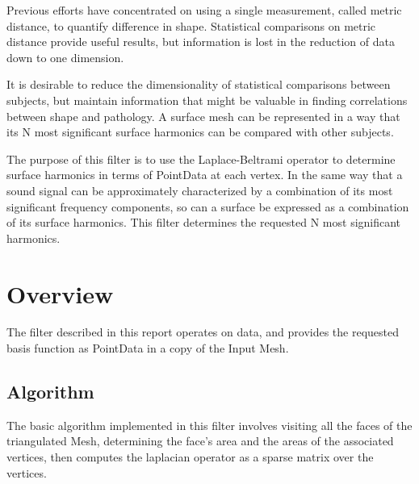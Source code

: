 \documentclass{InsightArticle}
\begin{document}
Previous efforts have concentrated on using a single measurement, called metric
distance, to quantify difference in shape.  Statistical comparisons on metric
distance provide useful results, but information is lost in the
reduction of data down to one dimension.

It is desirable to reduce the dimensionality of statistical comparisons
between subjects, but maintain information that might be valuable in finding
correlations between shape and pathology.  A surface mesh can be represented in a way that its N most significant surface harmonics can be compared with other
subjects.

The purpose of this filter is to use the Laplace-Beltrami operator to determine
surface harmonics in terms of PointData at each vertex.  In the same way that
a sound signal can be approximately characterized by a combination of its most
significant frequency components, so can a surface be expressed as a combination
of its surface harmonics.  This filter determines the requested N most
significant harmonics.


\section{Overview}

The filter described in this report operates on 
data, and provides
the requested basis function as PointData in a copy of the Input Mesh.

\subsection{Algorithm}

The basic algorithm implemented in this filter involves visiting all the
faces of the triangulated Mesh, determining the face's area and the areas of
the associated vertices, then computes the laplacian operator as a sparse
matrix over the vertices.

%
%



\end{document}
